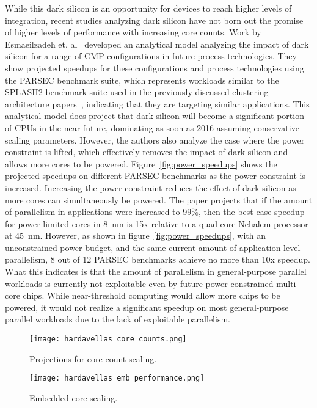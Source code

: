 While this dark silicon is an opportunity for devices to reach higher levels of
integration, recent studies analyzing dark silicon have not born out the
promise of higher levels of performance with increasing core counts.  Work by
Esmaeilzadeh et. al~\cite{Esmaeilzadeh2011Dark-silicon-an} developed an
analytical model analyzing the impact of dark silicon for a range of CMP
configurations in future process technologies. They show projected speedups for
these configurations and process technologies using the PARSEC benchmark suite,
which represents workloads similar to the SPLASH2 benchmark suite used in the
previously discussed clustering architecture
papers~\cite{dreslinski2010near,Zhai:2007kn}, indicating that they are
targeting similar applications. This analytical model does project that dark
silicon will become a significant portion of CPUs in the near future,
dominating as soon as 2016 assuming conservative scaling parameters. However,
the authors also analyze the case where the power constraint is lifted, which
effectively removes the impact of dark silicon and allows more cores to be
powered. Figure~\ref{fig:power_speedups} shows the projected speedups on
different PARSEC benchmarks as the power constraint is increased. Increasing
the power constraint reduces the effect of dark silicon as more cores can
simultaneously be powered. The paper projects that if the amount of parallelism
in applications were increased to 99\%, then the best case speedup for power
limited cores in \SI{8}{\nano\meter} is 15x relative to a quad-core Nehalem
processor at \SI{45}{\nano\meter}. However, as shown in
figure~\ref{fig:power_speedups}, with an unconstrained power budget, and the
same current amount of application level parallelism, 8 out of 12 PARSEC
benchmarks achieve no more than 10x speedup. What this indicates is that the
amount of parallelism in general-purpose parallel workloads is currently not
exploitable even by future power constrained multi-core chips. While
near-threshold computing would allow more chips to be powered, it would not
realize a significant speedup on most general-purpose parallel workloads due to
the lack of exploitable parallelism.

\begin{figure}[thpb]
    \centering
    \texttt{[image: hardavellas\_core\_counts.png]}
    \caption{Projections for core count scaling.~\cite{Hardavellas:2011de}}
    \label{fig:core_counts}
\end{figure}

\begin{figure}[thpb]
    \centering
    \texttt{[image: hardavellas\_emb\_performance.png]}
    \caption{Embedded core scaling.~\cite{Hardavellas:2011de}}
    \label{fig:emb_performance}
\end{figure}

